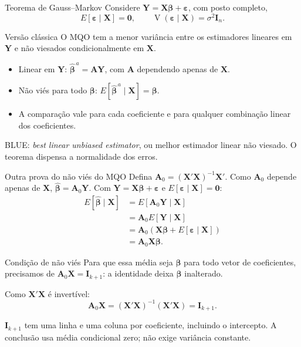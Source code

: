 \documentclass[
  ignorenonframetext,
  brazilian,
  aspectratio=169,
  10pt]{beamer}
\begin{document}
\begin{frame}{Teorema de Gauss--Markov}
\protect{}\label{teorema-de-gaussmarkov}
Considere
\(\mathbf Y=\mathbf X\boldsymbol\beta+\boldsymbol\varepsilon\), com
posto completo, \[
E[\boldsymbol\varepsilon\mid\mathbf X]=\mathbf 0,
\qquad
\operatorname{V}(\boldsymbol\varepsilon\mid\mathbf X)=\sigma^2\mathbf I_n.
\]

\begin{block}{Versão clássica}
O MQO tem a menor variância entre os estimadores lineares em $\mathbf Y$
e não viesados condicionalmente em $\mathbf X$.
\end{block}

\begin{itemize}
\item Linear em $\mathbf Y$: $\widehat{\boldsymbol\beta}^{\,a}=\mathbf A\mathbf Y$,
com $\mathbf A$ dependendo apenas de $\mathbf X$.
\item Não viés para todo $\boldsymbol\beta$:
$E[\widehat{\boldsymbol\beta}^{\,a}\mid\mathbf X]=\boldsymbol\beta$.
\item A comparação vale para cada coeficiente e para qualquer combinação linear dos coeficientes.
\end{itemize}

\small

BLUE: \textit{best linear unbiased estimator}, ou melhor estimador
linear não viesado. O teorema dispensa a normalidade dos erros.
\end{frame}

\begin{frame}{Outra prova do não viés do MQO}
\protect{}\label{outra-prova-do-nuxe3o-viuxe9s-do-mqo}
Defina \(\mathbf A_0=(\mathbf X'\mathbf X)^{-1}\mathbf X'\). Como
\(\mathbf A_0\) depende apenas de \(\mathbf X\),
\(\widehat{\boldsymbol\beta}=\mathbf A_0\mathbf Y\). Com
\(\mathbf Y=\mathbf X\boldsymbol\beta+\boldsymbol\varepsilon\) e
\(E[\boldsymbol\varepsilon\mid\mathbf X]=\mathbf 0\): \[
\begin{aligned}
E[\widehat{\boldsymbol\beta}\mid\mathbf X]
&=E[\mathbf A_0\mathbf Y\mid\mathbf X]\\
&=\mathbf A_0 E[\mathbf Y\mid\mathbf X]\\
&=\mathbf A_0(\mathbf X\boldsymbol\beta
+E[\boldsymbol\varepsilon\mid\mathbf X])\\
&=\mathbf A_0\mathbf X\boldsymbol\beta.
\end{aligned}
\]

\begin{block}{Condição de não viés}
Para que essa média seja $\boldsymbol\beta$ para todo vetor de coeficientes,
precisamos de $\mathbf A_0\mathbf X=\mathbf I_{k+1}$:
a identidade deixa $\boldsymbol\beta$ inalterado.
\end{block}

Como \(\mathbf X'\mathbf X\) é invertível: \[
\mathbf A_0\mathbf X=(\mathbf X'\mathbf X)^{-1}(\mathbf X'\mathbf X)
=\mathbf I_{k+1}.
\]

\small

\(\mathbf I_{k+1}\) tem uma linha e uma coluna por coeficiente,
incluindo o intercepto. A conclusão usa média condicional zero; não
exige variância constante.
\end{frame}
\end{document}
